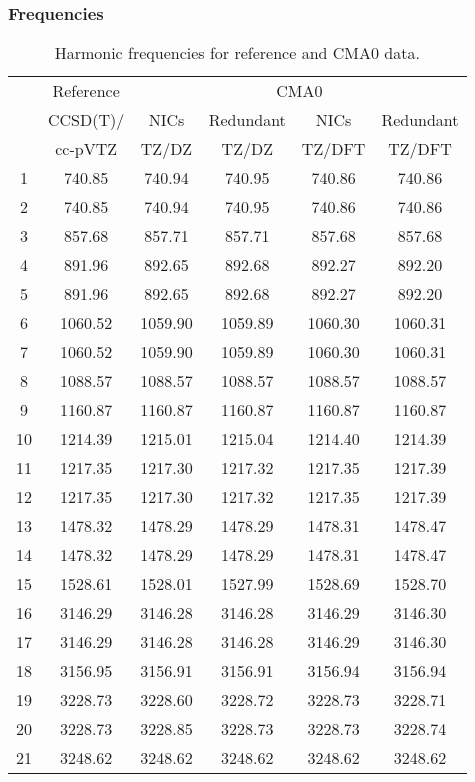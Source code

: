 \documentclass[10pt,oneside]{article}
\begin{document}
\begin{table}[h!]
\subsubsection*{Frequencies}
\centering
\caption{Harmonic frequencies for reference and CMA0 data.}
\begin{tabular}{cccccc}
\toprule
{} & Reference & \multicolumn{4}{c}{CMA0} \\
{} &  CCSD(T)/ &    NICs &  Redundant &    NICs & Redundant \\
{} &   cc-pVTZ &   TZ/DZ &      TZ/DZ &  TZ/DFT &    TZ/DFT \\
\midrule
1  &    740.85 &  740.94 &     740.95 &  740.86 &    740.86 \\
2  &    740.85 &  740.94 &     740.95 &  740.86 &    740.86 \\
3  &    857.68 &  857.71 &     857.71 &  857.68 &    857.68 \\
4  &    891.96 &  892.65 &     892.68 &  892.27 &    892.20 \\
5  &    891.96 &  892.65 &     892.68 &  892.27 &    892.20 \\
6  &   1060.52 & 1059.90 &    1059.89 & 1060.30 &   1060.31 \\
7  &   1060.52 & 1059.90 &    1059.89 & 1060.30 &   1060.31 \\
8  &   1088.57 & 1088.57 &    1088.57 & 1088.57 &   1088.57 \\
9  &   1160.87 & 1160.87 &    1160.87 & 1160.87 &   1160.87 \\
10 &   1214.39 & 1215.01 &    1215.04 & 1214.40 &   1214.39 \\
11 &   1217.35 & 1217.30 &    1217.32 & 1217.35 &   1217.39 \\
12 &   1217.35 & 1217.30 &    1217.32 & 1217.35 &   1217.39 \\
13 &   1478.32 & 1478.29 &    1478.29 & 1478.31 &   1478.47 \\
14 &   1478.32 & 1478.29 &    1478.29 & 1478.31 &   1478.47 \\
15 &   1528.61 & 1528.01 &    1527.99 & 1528.69 &   1528.70 \\
16 &   3146.29 & 3146.28 &    3146.28 & 3146.29 &   3146.30 \\
17 &   3146.29 & 3146.28 &    3146.28 & 3146.29 &   3146.30 \\
18 &   3156.95 & 3156.91 &    3156.91 & 3156.94 &   3156.94 \\
19 &   3228.73 & 3228.60 &    3228.72 & 3228.73 &   3228.71 \\
20 &   3228.73 & 3228.85 &    3228.73 & 3228.73 &   3228.74 \\
21 &   3248.62 & 3248.62 &    3248.62 & 3248.62 &   3248.62 \\
\bottomrule
\end{tabular}
\end{table}
\end{document}
